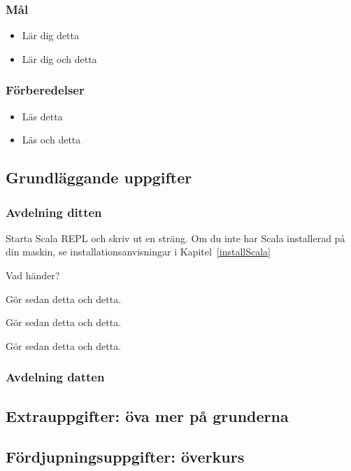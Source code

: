 

\subsubsection{Mål}
\begin{itemize}[nosep]
\item Lär dig detta
\item Lär dig och detta
\end{itemize}

\subsubsection{Förberedelser}
\begin{itemize}[nosep]
\item Läs detta
\item Läs och detta
\end{itemize}

\subsection{Grundläggande uppgifter}

\subsubsection{Avdelning ditten}

\TaskComputer Starta Scala REPL och skriv ut en sträng. Om du inte har Scala installerad på din maskin, se installationsanvisningar i Kapitel~\ref{installScala}


\noindent Vad händer?


\Task Gör sedan detta och detta. 

\TaskComputer Gör sedan detta och detta. 

\TaskPencil Gör sedan detta och detta.

\subsubsection{Avdelning datten}
\lipsum[7]

\subsection{Extrauppgifter: öva mer på grunderna}
\lipsum[2]


\subsection{Fördjupningsuppgifter: överkurs}
\lipsum[2]